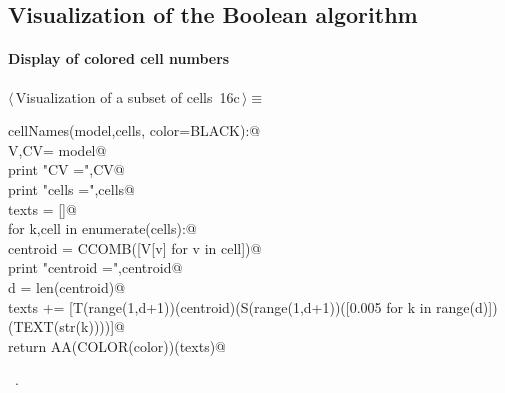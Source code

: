 \documentclass[11pt,oneside]{article}	%
\begin{document}
\subsection{Visualization of the Boolean algorithm}

\paragraph{Display of colored cell numbers}

\begin{flushleft} \small \label{scrap34}
\protect{}$\langle\,$Visualization of a subset of cells\nobreak\ {\footnotesize 16c}$\,\rangle\equiv$
\vspace{-1ex}
\begin{list}{}{} \item
\mbox{}\verb@def cellNames(model,cells, color=BLACK):@\\
\mbox{}\verb@   V,CV= model@\\
\mbox{}\verb@   print "\n CV =",CV@\\
\mbox{}\verb@   print "\n cells =",cells@\\
\mbox{}\verb@   texts = []@\\
\mbox{}\verb@   for k,cell in enumerate(cells):@\\
\mbox{}\verb@      centroid = CCOMB([V[v] for v in cell])@\\
\mbox{}\verb@      print "centroid =",centroid@\\
\mbox{}\verb@      d = len(centroid)@\\
\mbox{}\verb@      texts += [T(range(1,d+1))(centroid)(S(range(1,d+1))([0.005 for k in range(d)])(TEXT(str(k))))]@\\
\mbox{}\verb@   return AA(COLOR(color))(texts)@\\
\mbox{}\verb@@{\NWsep}
\end{list}
\vspace{-1ex}
\footnotesize\addtolength{\baselineskip}{-1ex}
\begin{list}{}{\setlength{\itemsep}{-\parsep}\setlength{\itemindent}{-\leftmargin}}
\item \NWtxtMacroRefIn\ .
\end{list}
\end{flushleft}
\end{document}
